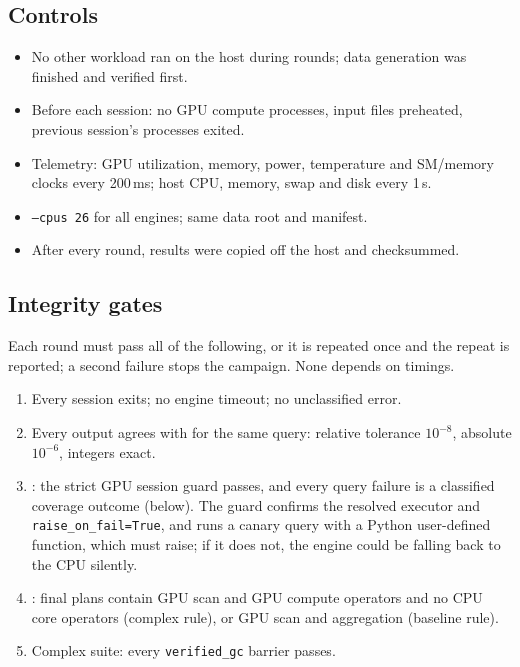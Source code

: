 \documentclass[11pt]{article}
\begin{document}
\subsection{Controls}
\label{sec:controls}
\begin{itemize}[leftmargin=*,itemsep=1pt]
  \item No other workload ran on the host during rounds; data generation was
    finished and verified first.
  \item Before each session: no GPU compute processes, input files preheated,
    previous session's processes exited.
  \item Telemetry: GPU utilization, memory, power, temperature and SM/memory
    clocks every 200\,ms; host CPU, memory, swap and disk every 1\,s.
  \item \texttt{--cpus 26} for all engines; same data root and manifest.
  \item After every round, results were copied off the host and checksummed.
\end{itemize}

\subsection{Integrity gates}
\label{sec:gates}

Each round must pass all of the following, or it is repeated once and the
repeat is reported; a second failure stops the campaign. None depends on
timings.
\begin{enumerate}[leftmargin=*,itemsep=1pt]
  \item Every session exits; no engine timeout; no unclassified error.
  \item Every output agrees with \polarscpu{} for the same query: relative
    tolerance $10^{-8}$, absolute $10^{-6}$, integers exact.
  \item \polarsgpu{}: the strict GPU session guard passes, and every query
    failure is a classified coverage outcome (below). The guard confirms the resolved
    executor and \texttt{raise\_on\_fail=True}, and runs a canary query with a
    Python user-defined function, which must raise; if it does not, the
    engine could be falling back to the CPU silently.
  \item \sparkgpu{}: final plans contain GPU scan and GPU compute operators and
    no CPU core operators (complex rule), or GPU scan and aggregation
    (baseline rule).
  \item Complex suite: every \texttt{verified\_gc} barrier passes.
\end{enumerate}
\end{document}
